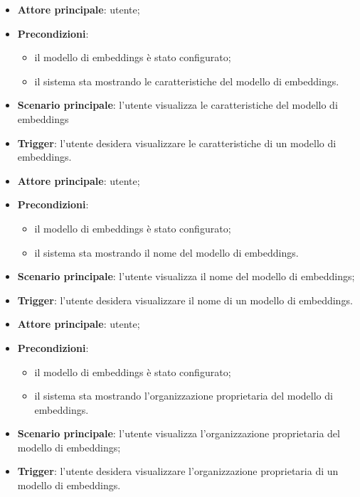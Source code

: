 \documentclass[10pt, a4paper]{article}
\begin{document}
    \begin{itemize}
        \item \textbf{Attore principale}: utente;
        \item \textbf{Precondizioni}:
        \begin{itemize}
            \item il modello di embeddings è stato configurato;
            \item il sistema sta mostrando le caratteristiche del modello di embeddings.
        \end{itemize}
        \item \textbf{Scenario principale}: l'utente visualizza le caratteristiche del modello di embeddings
        \item \textbf{Trigger}: l’utente desidera visualizzare le caratteristiche di un modello di embeddings.
    \end{itemize}

    \begin{itemize}
        \item \textbf{Attore principale}: utente;
        \item \textbf{Precondizioni}:
        \begin{itemize}
            \item il modello di embeddings è stato configurato;
            \item il sistema sta mostrando il nome del modello di embeddings.
        \end{itemize}
        \item \textbf{Scenario principale}: l'utente visualizza il nome del modello di embeddings;
        \item \textbf{Trigger}: l’utente desidera visualizzare il nome di un modello di embeddings.
    \end{itemize}

    \begin{itemize}
        \item \textbf{Attore principale}: utente;
        \item \textbf{Precondizioni}:
        \begin{itemize}
            \item il modello di embeddings è stato configurato;
            \item il sistema sta mostrando l'organizzazione proprietaria del modello di embeddings.
        \end{itemize}
        \item \textbf{Scenario principale}: l'utente visualizza l'organizzazione proprietaria del modello di embeddings;
        \item \textbf{Trigger}: l’utente desidera visualizzare l'organizzazione proprietaria di un modello di embeddings.
    \end{itemize}
\end{document}
